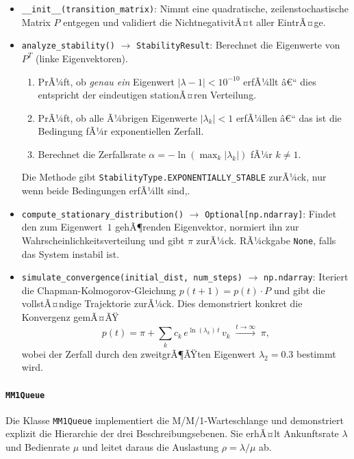﻿\documentclass[a4paper,12pt]{scrreprt}
\theoremstyle{definition}
\begin{document}
\begin{itemize}
	\item \texttt{\_\_init\_\_(transition\_matrix)}: Nimmt eine
	quadratische, zeilenstochastische Matrix $P$ entgegen und
	validiert die NichtnegativitÃ¤t aller EintrÃ¤ge.
	
	\item \texttt{analyze\_stability()} $\to$ \texttt{StabilityResult}:
	Berechnet die Eigenwerte von $P^T$ (linke Eigenvektoren).
	\begin{enumerate}
		\item PrÃ¼ft, ob \emph{genau ein} Eigenwert
		$|\lambda - 1| < 10^{-10}$ erfÃ¼llt â€“ dies
		entspricht der eindeutigen stationÃ¤ren Verteilung.
		\item PrÃ¼ft, ob alle Ã¼brigen Eigenwerte $|\lambda_k| < 1$
		erfÃ¼llen â€“ das ist die Bedingung fÃ¼r exponentiellen
		Zerfall.
		\item Berechnet die Zerfallsrate
		$\alpha = -\ln(\max_k |\lambda_k|)$ fÃ¼r $k \neq 1$.
	\end{enumerate}
	Die Methode gibt \texttt{StabilityType.EXPONENTIALLY\_STABLE} zurÃ¼ck, nur wenn beide Bedingungen erfÃ¼llt sind,.
	
	\item \texttt{compute\_stationary\_distribution()} $\to$
	\texttt{Optional[np.ndarray]}:  Findet den zum Eigenwert~$1$
	gehÃ¶renden Eigenvektor, normiert ihn zur
	Wahrscheinlichkeitsverteilung und gibt $\pi$ zurÃ¼ck.
	RÃ¼ckgabe \texttt{None}, falls das System instabil ist.
	
	\item \texttt{simulate\_convergence(initial\_dist, num\_steps)}
	$\to$ \texttt{np.ndarray}:  Iteriert die
	Chapman-Kolmogorov-Gleichung $p(t+1) = p(t) \cdot P$ und
	gibt die vollstÃ¤ndige Trajektorie zurÃ¼ck.  Dies demonstriert
	konkret die Konvergenz gemÃ¤ÃŸ
	\[
	p(t) = \pi + \sum_{k} c_k\, e^{\ln(\lambda_k)\,t}\, v_k
	\;\xrightarrow{t\to\infty}\; \pi,
	\]
	wobei der Zerfall durch den zweitgrÃ¶ÃŸten Eigenwert
	$\lambda_2 = 0.3$ bestimmt wird.
\end{itemize}

\paragraph{\texttt{MM1Queue}}

Die Klasse \texttt{MM1Queue} implementiert die M/M/1-Warteschlange
und demonstriert explizit die Hierarchie der drei
Beschreibungsebenen.  Sie erhÃ¤lt Ankunftsrate $\lambda$ und
Bedienrate $\mu$ und leitet daraus die Auslastung $\rho = \lambda/\mu$
ab.
\end{document}
